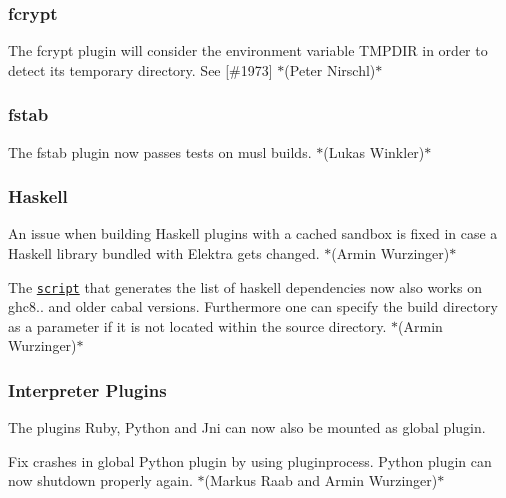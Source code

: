 \subsubsection*{fcrypt}


\begin{DoxyItemize}
\item The {\ttfamily fcrypt} plugin will consider the environment variable {\ttfamily T\+M\+P\+D\+IR} in order to detect its temporary directory. See \mbox{[}\#1973\mbox{]} $\ast$(Peter Nirschl)$\ast$
\end{DoxyItemize}

\subsubsection*{fstab}


\begin{DoxyItemize}
\item The {\ttfamily fstab} plugin now passes tests on musl builds. $\ast$(Lukas Winkler)$\ast$
\end{DoxyItemize}

\subsubsection*{Haskell}


\begin{DoxyItemize}
\item An issue when building Haskell plugins with a cached sandbox is fixed in case a Haskell library bundled with Elektra gets changed. $\ast$(Armin Wurzinger)$\ast$
\item The \href{https://master.libelektra.org/scripts/generate-haskell-dependencies}{\tt script} that generates the list of haskell dependencies now also works on ghc8.. and older cabal versions. Furthermore one can specify the build directory as a parameter if it is not located within the source directory. $\ast$(Armin Wurzinger)$\ast$
\end{DoxyItemize}

\subsubsection*{Interpreter Plugins}


\begin{DoxyItemize}
\item The plugins Ruby, Python and Jni can now also be mounted as global plugin.
\item Fix crashes in global Python plugin by using pluginprocess. Python plugin can now shutdown properly again. $\ast$(Markus Raab and Armin Wurzinger)$\ast$
\end{DoxyItemize}

